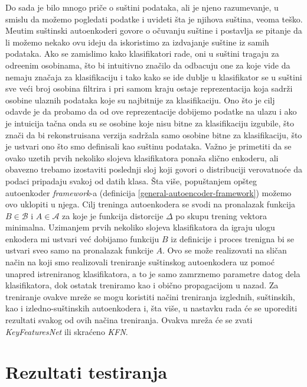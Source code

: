 \documentclass{article}
\let\oldsection\section
\renewcommand\section{\clearpage\oldsection}
\begin{document}
	Do sada je bilo mnogo pri\v ce o su\v stini podataka, ali je njeno razumevanje, u smislu da mo\v zemo pogledati podatke i uvideti \v sta je njihova su\v stina, veoma te\v sko.
	Me\dj utim su\v stinski autoenkoderi govore o o\v cuvanju su\v stine i postavlja se pitanje da li mo\v zemo nekako ovu ideju da iskoristimo za izdvajanje su\v stine iz samih podataka.
	Ako se zamislimo kako klasifikatori rade, oni u su\v stini tragaju za odre\dj enim osobinama, \v sto bi intuitivno zna\v cilo da odbacuju one za koje vide da nemaju zna\v caja za klasifikaciju i tako kako se ide dublje u klasifikator se u su\v stini sve ve\'ci broj osobina filtrira i pri samom kraju ostaje reprezentacija koja sadr\v zi osobine ulaznih podataka koje su najbitnije za klasifikaciju.
	Ono \v sto je cilj odavde je da probamo da od ove reprezentacije dobijemo podatke na ulazu i ako je intuicija ta\v cna onda su se osobine koje nisu bitne za klasifikaciju izgubile, \v sto zna\v ci da bi rekonstruisana verzija sadr\v zala samo osobine bitne za klasifikaciju, \v sto je ustvari ono \v sto smo definisali kao su\v stinu podataka.
	Va\v zno je primetiti da se ovako uzetih prvih nekoliko slojeva klasifikatora pona\v sa sli\v cno enkoderu, ali obavezno trebamo izostaviti poslednji sloj koji govori o distribuciji verovatno\'ce da  podaci pripadaju svakoj od datih klasa. 
	\v Sta vi\v se, popu\v stanjem op\v steg autoenkoder \textit{framework}-a (definicija \ref{general-autoencoder-framework}) mo\v zemo ovo uklopiti u njega.
	Cilj treninga autoenkodera se svodi na pronalazak funkcija $B \in \mathcal{B}$ i $A \in \mathcal{A}$ za koje je funkcija distorcije $\Delta$ po skupu trening vektora minimalna.
	Uzimanjem prvih nekoliko slojeva klasifikatora da igraju ulogu enkodera mi ustvari ve\'c dobijamo funkciju $B$ iz definicije i proces trenigna bi se ustvari sveo samo na pronalazak funkcije $A$. 
	Ovo se mo\v ze realizovati na sli\v can na\v cin na koji smo realizovali treniranje su\v stinskog autoenkodera uz pomo\'c unapred istreniranog klasifikatora, a to je samo zamrznemo parametre datog dela klasifikatora, dok ostatak treniramo kao i obi\v cno propagacijom u nazad.
	Za treniranje ovakve mre\v ze se mogu koristiti na\v cini treniranja izglednih, su\v stinskih, kao i izledno-su\v stinskih autoenkodera i, \v sta vi\v se, u nastavku rada \'ce se uporediti rezultati svakog od ovih na\v cina treniranja.
	Ovakva mre\v za \'ce se zvati \emph{KeyFeaturesNet} ili skra\'ceno \emph{KFN}.
	
	
	\section{Rezultati testiranja}
	
\end{document}
